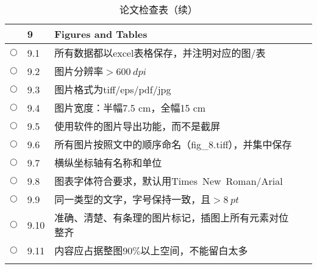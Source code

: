 \documentclass{ctexart}
\begin{document}
\begin{table}[h]
\begin{tabular}{|c|l|l|l|}
 & 9 & \textcolor[rgb]{0.00,0.00,1.00}{\textbf{Figures and Tables}}&\\\hline
$\bigcirc$& 9.1 & 所有数据都以excel表格保存，并注明对应的图/表 &\\\hline
$\bigcirc$& 9.2 & 图片分辨率$>600~dpi$ &\\\hline
$\bigcirc$& 9.3 & 图片格式为tiff/eps/pdf/jpg &\\\hline
$\bigcirc$& 9.4 & 图片宽度：半幅7.5 cm，全幅15 cm&\\\hline
$\bigcirc$& 9.5 & 使用软件的图片导出功能，而不是截屏&\\\hline
$\bigcirc$& 9.6 & 所有图片按照文中的顺序命名（fig\_8.tiff），并集中保存&\\\hline
$\bigcirc$& 9.7 & 横纵坐标轴有名称和单位&\\\hline
$\bigcirc$& 9.8 & 图表字体符合要求，默认用Times New Roman/Arial&\\\hline
$\bigcirc$& 9.9 & 同一类型的文字，字号保持一致，且$>8~pt$&\\\hline
$\bigcirc$& 9.10 & 准确、清楚、有条理的图片标记，插图上所有元素对位整齐 &\\\hline
$\bigcirc$& 9.11 & 内容应占据整图$90\%$以上空间，不能留白太多&\\\hline
$ $&  &  &\\\hline
\end{tabular}
\caption{论文检查表（续）}\label{tab:8}
\end{table}
\end{document}
